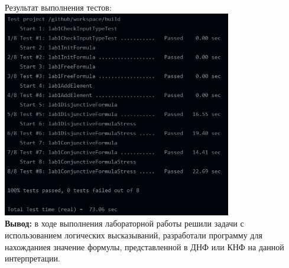 \documentclass[a4paper,14pt]{extarticle}
\begin{document}
Результат выполнения тестов: \\
\includegraphics[width=100mm]{testsresult}\\
\textbf{Вывод: }в ходе выполнения лабораторной работы решили задачи с использованием логических высказываний, разработали программу
для нахожданиея значение формулы, представленной в ДНФ или КНФ на данной интерпретации.\\
\end{document}
